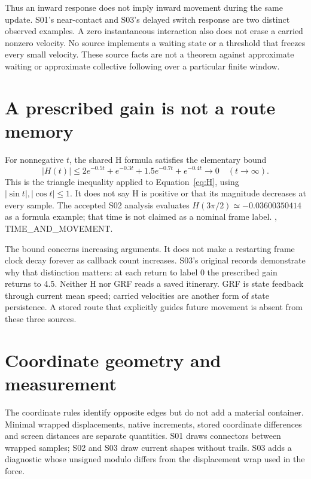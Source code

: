 Thus an inward response does not imply inward movement during the
same update. S01's near-contact and S03's delayed switch response
are two distinct observed examples. A zero instantaneous interaction
also does not erase a carried nonzero velocity. No source implements
a waiting state or a threshold that freezes every small velocity.
These source facts are not a theorem against approximate waiting
or approximate collective following over a particular finite window.

\section{A prescribed gain is not a route memory}
For nonnegative $t$, the shared H formula satisfies the elementary
bound
\begin{equation}\label{eq:Hbound}
|H(t)|\leq 2e^{-0.5t}+e^{-0.3t}+1.5e^{-0.7t}+e^{-0.4t}
\longrightarrow0\quad (t\to\infty).
\end{equation}
This is the triangle inequality applied to
Equation~\eqref{eq:H}, using $|\sin t|,|\cos t|\leq1$.
It does not say H is positive or that its magnitude decreases at
every sample. The accepted S02 analysis evaluates
$H(3\pi/2)\simeq-0.03600350414$ as a formula example; that time is
not claimed as a nominal frame label.
\cite{construction02}, TIME\_AND\_MOVEMENT. 

The bound concerns increasing arguments. It does not make a
restarting frame clock decay forever as callback count increases.
S03's original records demonstrate why that distinction matters:
at each return to label 0 the prescribed gain returns to 4.5.
Neither H nor GRF reads a saved itinerary. GRF is state feedback
through current mean speed; carried velocities are another form
of state persistence. A stored route that explicitly guides future
movement is absent from these three sources. 


\section{Coordinate geometry and measurement}
The coordinate rules identify opposite edges but do not add a
material container. Minimal wrapped displacements, native increments,
stored coordinate differences and screen distances are separate
quantities. S01 draws connectors between wrapped samples; S02 and S03
draw current shapes without trails. S03 adds a diagnostic whose
unsigned modulo differs from the displacement wrap used in the force.

